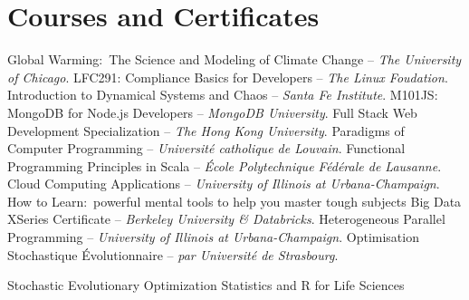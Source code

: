 \section{Courses and Certificates}

\bgroup\eightpoint

  {Global Warming:~The Science and Modeling of Climate Change -- {\it%
   The University of Chicago}.}
  {LFC291: Compliance Basics for Developers -- {\it The Linux Foudation}.}
  {Introduction to Dynamical Systems and Chaos -- {\it Santa Fe Institute}.}
  {M101JS: MongoDB for Node.js Developers -- {\it MongoDB University}.}
  {Full Stack Web Development Specialization -- {\it The Hong Kong University}.}
  {Paradigms of Computer Programming -- {\it Universit\'e catholique de Louvain}.}
  {Functional Programming Principles in Scala -- {\it \'Ecole Polytechnique F\'ed\'erale de Lausanne}.}
  {Cloud Computing Applications -- {\it University of Illinois at Urbana-Champaign}.}
  {How to Learn:~powerful mental tools to help you master tough subjects}
  {Big Data XSeries Certificate -- {\it Berkeley University \& Databricks}.}
  {Heterogeneous Parallel Programming -- {\it University of Illinois at Urbana-Champaign}.}
  {Optimisation Stochastique \'Evolutionnaire -- {\it par Universit\'e de Strasbourg}.}
\egroup

\bigskip
\bgroup\eightpoint
{}

   {Stochastic Evolutionary Optimization}
   {Statistics and R for Life Sciences}

